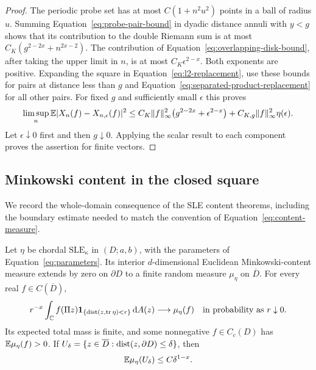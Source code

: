 \begin{proof}
The periodic probe set has at most $C(1+n^2u^2)$ points in a ball of
radius $u$.  Summing Equation~\eqref{eq:probe-pair-bound} in dyadic
distance annuli with $y<g$ shows that its contribution to the double
Riemann sum is at most
$C_K(g^{2-2x}+n^{2x-2})$.  The contribution of
Equation~\eqref{eq:overlapping-disk-bound}, after taking the upper
limit in $n$, is at most $C_K\epsilon^{2-x}$.  Both exponents are
positive.  Expanding the square in
Equation~\eqref{eq:l2-replacement}, use these bounds for pairs at
distance less than $g$ and
Equation~\eqref{eq:separated-product-replacement} for all other pairs.
For fixed $g$ and sufficiently small $\epsilon$ this proves
\[
 \limsup_n\mathbb E|X_n(f)-X_{n,\epsilon}(f)|^2
 \le C_K\|f\|_\infty^2
       \bigl(g^{2-2x}+\epsilon^{2-x}\bigr)
       +C_{K,g}\|f\|_\infty^2\eta(\epsilon).
\]
Let $\epsilon\downarrow0$ first and then $g\downarrow0$.
Applying the scalar result to each component proves the assertion for
finite vectors.
\end{proof}

\subsection{Minkowski content in the closed square}

We record the whole-domain consequence of the SLE content theorems,
including the boundary estimate needed to match the convention of
Equation~\eqref{eq:content-measure}.

\begin{lemma}
\label{lem:whole-content}
Let $\eta$ be chordal $\mathrm{SLE}_\kappa$ in $(D;a,b)$, with the
parameters of Equation~\eqref{eq:parameters}.  Its interior
$d$-dimensional Euclidean Minkowski-content measure extends by zero
on $\partial D$ to a finite random measure $\mu_\eta$ on
$\overline D$.  For every real $f\in C(\overline D)$,
\begin{equation}
 r^{-x}\int_\mathbb C f(\Pi z)
       \mathbf 1_{\{\operatorname{dist}(z,\operatorname{tr}\eta)<r\}}\,\mathrm d A(z)
 \longrightarrow \mu_\eta(f)
 \quad\hbox{in probability as }r\downarrow0.
 \label{eq:whole-content-convergence}
\end{equation}
Its expected total mass is finite, and some nonnegative
$f\in C_c(D)$ has $\mathbb E\mu_\eta(f)>0$.  If
$U_\delta=\{z\in\overline D:\operatorname{dist}(z,\partial D)\le\delta\}$,
then
\begin{equation}
 \mathbb E\mu_\eta(U_\delta)\le C\delta^{1-x}.
 \label{eq:continuum-boundary-strip}
\end{equation}
\end{lemma}

